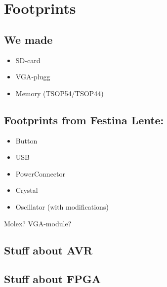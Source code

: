 \section {Footprints}
\subsection {We made}
        \begin {itemize}
        \item SD-card
        \item VGA-plugg
        \item Memory (TSOP54/TSOP44)
        \end {itemize}

        \subsection {Footprints from Festina Lente:
                    }
        \begin {itemize}
        \item Button
        \item USB
        \item PowerConnector
        \item Crystal
        \item Oscillator (with modifications)
        \end {itemize}
        Molex?
        VGA-module?

        \subsection {Stuff about AVR}
        \subsection {Stuff about FPGA}


